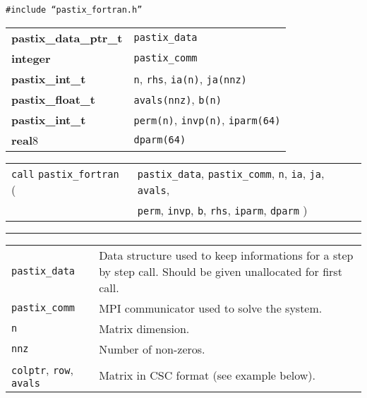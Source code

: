 \documentclass{article}
\newcommand{\type}[1]{\textbf{#1}}
\newcommand{\var}[1]{\texttt{#1}}
\newcommand{\func}[1]{\texttt{#1}}
\newcommand{\forkey}[1]{\texttt{#1}}
\newcommand{\st}{\raisebox{-0.5ex}{*}}
\newenvironment{tabI}{\begin{tabular}{p{30mm}p{96mm}}}{\end{tabular}}
\begin{document}
\begin{multicols}{2}
\texttt{\#include ``pastix\_fortran.h''}

\begin{tabular}{ll}
  \type{pastix\_data\_ptr\_t} &  \var{pastix\_data}\\
  \type{integer}              &  \var{pastix\_comm}\\
  \type{pastix\_int\_t}       &  \var{n}, \var{rhs}, \var{ia(n)}, \var{ja(nnz)}\\
  \type{pastix\_float\_t}     &  \var{avals(nnz)}, \var{b(n)}\\
  \type{pastix\_int\_t}       &  \var{perm(n)}, \var{invp(n)}, \var{iparm(64)}\\
  \type{real}\st{}8           &  \var{dparm(64)}\\
\end{tabular}

\begin{tabular}{l@{ }l}
  \forkey{call} \func{pastix\_fortran} ( & \var{pastix\_data},
  \var{pastix\_comm}, \var{n}, \var{ia}, \var{ja}, \var{avals},\\
                       & \var{perm}, \var{invp}, \var{b}, \var{rhs},
  \var{iparm}, \var{dparm} )\\
\end{tabular}
  \hrule
  \begin{tabI}
    \texttt{pastix\_data} & Data structure used to keep informations for a
    step by step call. Should be given unallocated for first call.\\
    \texttt{pastix\_comm} & MPI communicator used to solve the system.\\
    \texttt{n}            & Matrix dimension.\\
    \texttt{nnz}          & Number of non-zeros.\\
    \texttt{colptr}, \texttt{row},       \texttt{avals} 
    & Matrix in CSC format (see example below).\\
    

\end{tabI}
\end{multicols}
\end{document}
